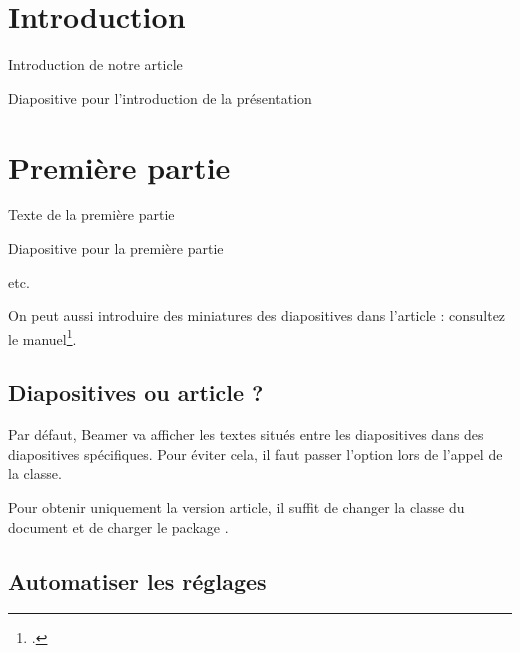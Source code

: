 \begin{latexcode}
\section{Introduction}

Introduction de notre article
\begin{frame}
    Diapositive pour l'introduction de la présentation
\end{frame}

\section{Première partie}

Texte de la première partie
\begin{frame}
    Diapositive pour la première partie
\end{frame}

etc.
\end{latexcode}

\begin{plusloins}
On peut aussi introduire des miniatures des diapositives  dans l'article : consultez le manuel\footcite{beamer_diapo_article}. 
\end{plusloins}

\subsection{Diapositives ou article ?}

Par défaut, Beamer va afficher les textes situés entre les diapositives dans des diapositives spécifiques. Pour éviter cela, il faut passer l'option  lors de l'appel de la classe.


Pour obtenir uniquement la version article, il suffit de changer la classe du document et de charger le package .


\subsection{Automatiser les réglages}

